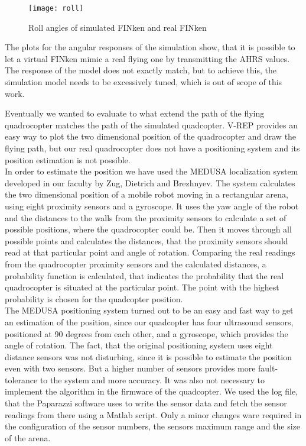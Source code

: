 \begin{figure}
	\begin{center}
	\texttt{[image: roll]}
	\caption{Roll angles of simulated FINken and real FINken}
	\label{pic:rollResponse}
	\end{center}
\end{figure}

The plots for the angular responses of the simulation show, that it is possible to let a virtual FINken mimic a real flying one by transmitting the \gls{AHRS} values. 
The response of the model does not exactly match, but to achieve this, the simulation model needs to be excessively tuned, which is out of scope of this work.



Eventually we wanted to evaluate to what extend the path of the flying quadrocopter matches the path of the simulated quadcopter. V-REP provides an easy way to plot the two dimensional position of the quadrocopter and draw the flying path, but our real quadrocopter does not have a positioning system and its position estimation is not possible.\\ 

In order to estimate the position we have used the MEDUSA localization system developed in our faculty by Zug, Dietrich and Brezhnyev\cite{Zug2011RobLoc}. 
The system calculates the two dimensional position of a mobile robot moving in a rectangular arena, using eight proximity sensors and a gyroscope. 
It uses the yaw angle of the robot and the distances to the walls from the proximity sensors to calculate a set of possible positions, where the quadrocopter could be. 
Then it moves through all possible points and calculates the distances, that the proximity sensors should read at that particular point and angle of rotation. 
Comparing the real readings from the quadrocopter proximity sensors and the calculated distances, a probability function is calculated, that indicates the probability that the real quadrocopter is situated at the particular point. 
The point with the highest probability is chosen for the quadcopter position.\\

The MEDUSA positioning system turned out to be an easy and fast way to get an estimation of the position, since our quadcopter has four ultrasound sensors, positioned at 90 degrees from each other, and a gyroscope, which provides the angle of rotation. 
The fact, that the original positioning system uses eight distance sensors was not disturbing, since it is possible to estimate the position even with two sensors. 
But a higher number of sensors provides more fault-tolerance to the system and more accuracy. 
It was also not necessary to implement the algorithm in the firmware of the quadcopter. 
We used the log file, that the Paparazzi software uses to write the sensor data and fetch the sensor readings from there using a Matlab script. 
Only a minor changes ware required in the configuration of the sensor numbers, the sensors maximum range and the size of the arena.\\

